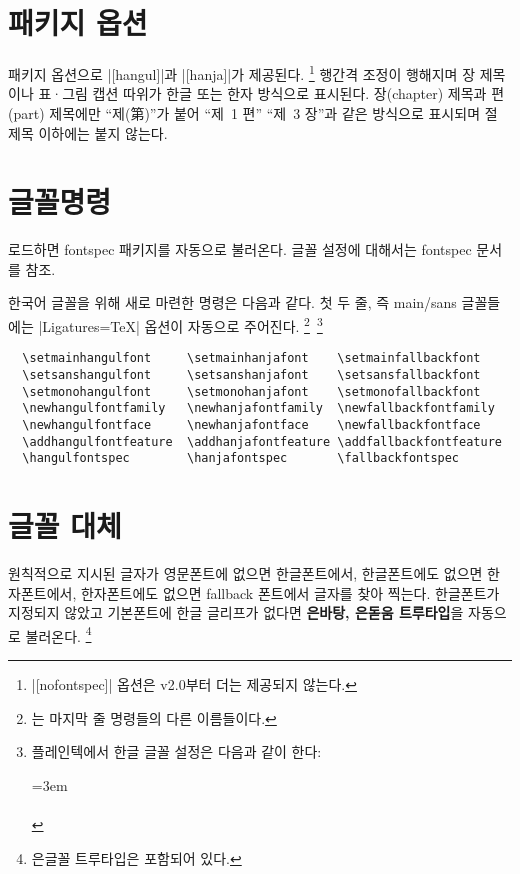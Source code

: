 \documentclass[a4paper]{article}
\def\luatex{\hologo{LuaTeX}}
\def\logoko{\textsf{k}\kern-.0625em\textit{o}}
\def\luatexko{\luatex-\logoko}
\def\texlive{\TeX\ Live}
\def\hemph#1{\textsf{\bfseries #1}}
\begin{document}
\section{패키지 옵션}\label{sec:packageopt}

패키지 옵션으로 |[hangul]|과 |[hanja]|가 제공된다.%
\footnote{%
  |[nofontspec]| 옵션은 v2.0부터 더는 제공되지 않는다. }
행간격 조정이 행해지며
장 제목이나 표·그림 캡션 따위가 한글 또는 한자 방식으로 표시된다.
장(chapter) 제목과 편(part) 제목에만 ``제(第)''가 붙어 ``제~1 편''
``제~3 장''과 같은 방식으로 표시되며 절 제목 이하에는 붙지 않는다.

\section{글꼴명령}\label{sec:fontcmds}

 로드하면 fontspec 패키지를 자동으로 불러온다. 글꼴 설정에
대해서는 fontspec 문서를 참조.

한국어 글꼴을 위해 새로 마련한 명령은 다음과 같다.
첫 두 줄, 즉 main/sans 글꼴들에는 |Ligatures=TeX| 옵션이 자동으로 주어진다.%
\footnote{%
    는
  마지막 줄 명령들의 다른 이름들이다. }\,%
\footnote{%
  플레인텍에서 한글 글꼴 설정은 다음과 같이 한다:\par
  \leftskip=3em\noindent
  \\
  \\
   }
\begin{verbatim}
  \setmainhangulfont     \setmainhanjafont    \setmainfallbackfont
  \setsanshangulfont     \setsanshanjafont    \setsansfallbackfont
  \setmonohangulfont     \setmonohanjafont    \setmonofallbackfont
  \newhangulfontfamily   \newhanjafontfamily  \newfallbackfontfamily
  \newhangulfontface     \newhanjafontface    \newfallbackfontface
  \addhangulfontfeature  \addhanjafontfeature \addfallbackfontfeature
  \hangulfontspec        \hanjafontspec       \fallbackfontspec
\end{verbatim}

\section{글꼴 대체}\label{sec:fontswitch}

원칙적으로  지시된 글자가 영문폰트에 없으면 한글폰트에서,
한글폰트에도 없으면 한자폰트에서, 한자폰트에도 없으면 fallback
폰트에서 글자를 찾아 찍는다.
한글폰트가 지정되지 않았고 기본폰트에 한글 글리프가 없다면
\hemph{은바탕, 은돋움 트루타입}을 자동으로 불러온다.%
\footnote{%
  은글꼴 트루타입은  포함되어 있다. }
\end{document}
